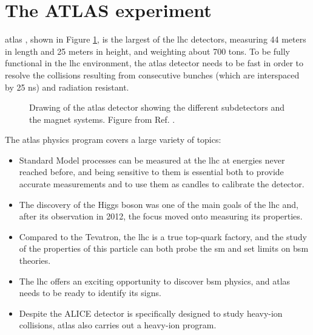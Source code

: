 
\section{The ATLAS experiment}
\label{sed:cern:atlas}

\gls{atlas} \cite{atlas:atlas}, shown in Figure \ref{fig:atlas:atlas}, is the largest of the \gls{lhc} detectors, 
measuring 44 meters in length and 25 meters in height, and weighting about 700 tons. 
To be fully functional in the \gls{lhc} environment,  the \gls{atlas} detector needs to be fast in order to resolve the collisions resulting from consecutive bunches (which are interspaced by 25 ns) and radiation resistant. 

\begin{figure}[ht]
\centering
{}
\caption{Drawing of the \gls{atlas} detector showing the different subdetectors and
the magnet systems. Figure from Ref. \cite{atlas:atlas}.}
\label{fig:atlas:atlas}
\end{figure}

The \gls{atlas} physics program covers a large variety of topics: 
\begin{itemize}
\item Standard Model processes can be measured at the \gls{lhc} at energies never reached before, and being sensitive to them is essential both to provide accurate measurements and to use them as candles to calibrate the detector. 
\item The discovery of the Higgs boson was one of the main goals of the \gls{lhc} and, after its observation in 2012, the focus moved onto measuring its properties. 
\item Compared to the Tevatron, the \gls{lhc} is a true top-quark factory, 
and the study of the properties of this particle can both probe the \gls{sm} and set limits on \gls{bsm} theories.
\item The \gls{lhc} offers an exciting opportunity to discover \gls{bsm} physics, and \gls{atlas} needs to be ready to identify its signs.
\item Despite the ALICE detector is specifically designed to study heavy-ion collisions, \gls{atlas} also carries out a heavy-ion program.
\end{itemize}

